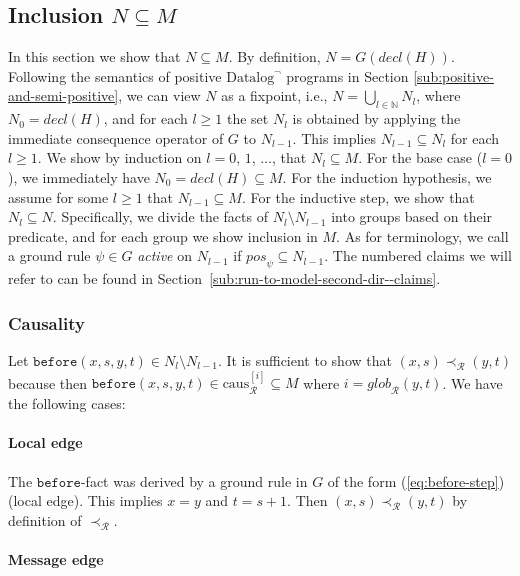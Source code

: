 \documentclass{tlp}
\newcommand{\langname}[1]{\text{#1}}  \newcommand{\pred}[1]{\mathtt{#1}}  \newcommand{\fname}[1]{\mathit{#1}}  \newcommand{\sq}[1]{`{#1}'}
\newcommand{\datalogneg}{\langname{Datalog}^{\neg}}
\newcommand{\Nat}{\mathbb{N}}  \newcommand{\len}[1]{|#1|} \newcommand{\rom}[1]{\text{\emph{(#1)}}} \newcommand{\romI}{\rom i}
\newcommand{\bpos}[1]{\fname{pos}_{#1}}
\newcommand{\grl}{\psi}
\newcommand{\before}{\pred{before}}
\newcommand{\decl}[1]{\fname{decl}(#1)}
\newcommand{\run}{\mathcal{R}}
\newcommand{\globR}[1]{\fname{glob}_{\run}(#1)}
\newcommand{\slicecaus}[1]{\text{caus}_{\run}^{[#1]}}
\newcommand{\caus}{\prec_{\run}}
\newcommand{\grded}{G}
\begin{document}
\begin{appendix}
\subsection{Inclusion $N\subseteq M$}

\label{sub:N-in-M}



\newcommand{\prevN}{N_{l-1}}


\newcommand{\diffN}{N_{l}\setminus N_{l-1}}


In this section we show that $N\subseteq M$. By definition, $N=\grded(\decl H)$.
 Following the semantics of positive $\datalogneg$ programs in Section
\ref{sub:positive-and-semi-positive}, we can view $N$ as a fixpoint,
i.e., $N=\bigcup_{l\in\Nat}N_{l}$, where $N_{0}=\decl H$, and for
each $l\geq1$ the set $N_{l}$ is obtained by applying the immediate
consequence operator of $\grded$ to $N_{l-1}$. This implies $N_{l-1}\subseteq N_{l}$
for each $l\geq1$. We show by induction on $l=0$, $1$, $\ldots$,
that $N_{l}\subseteq M$. For the base case ($l=0$), we immediately
have $N_{0}=\decl H\subseteq M$. For the induction hypothesis, we
assume for some $l\geq1$ that $N_{l-1}\subseteq M$. For the inductive
step, we show that $N_{l}\subseteq N$. Specifically, we divide the
facts of $N_{l}\setminus N_{l-1}$ into groups based on their predicate,
and for each group we show inclusion in $M$. As for terminology,
we call a ground rule $\grl\in G$ \emph{active} on $\prevN$ if
$\bpos{\grl}\subseteq\prevN$. The numbered claims we will refer to
can be found in Section~\ref{sub:run-to-model-second-dir--claims}.


\subsubsection{Causality}

Let $\before(x,s,y,t)\in\diffN$. It is sufficient to show that $(x,s)\caus(y,t)$
because then $\before(x,s,y,t)\in\slicecaus i\subseteq M$ where $i=\globR{y,t}$.
We have the following cases:


\paragraph*{Local edge}

The $\before$-fact was derived by a ground rule in $\grded$ of the
form (\ref{eq:before-step}) (local edge). This implies $x=y$ and
$t=s+1$. Then $(x,s)\caus(y,t)$ by definition of $\caus$.


\paragraph*{Message edge}


\end{appendix}
\end{document}
